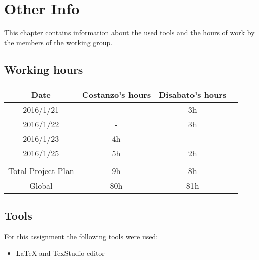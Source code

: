 \documentclass[\mainpath/main]{subfiles}
\begin{document}
\chapter{Other Info}
\label{OtherInfo}

\setmyfancystyle

This chapter contains information about the used tools and the hours of work by the members of the working group.

\section{Working hours}
\begin{table}[h!]
	\centering
\begin{tabular}{cccc}
\hline
Date     	& Costanzo's hours & Disabato's hours  & \\ \hline
2016/1/21 	& -			  	   & 3h 			   & \\ \hline
2016/1/22 	& -			  	   & 3h 			   & \\ \hline
2016/1/23   & 4h               & -                 & \\ \hline
2016/1/25   & 5h             & 2h                & \\ \hline
\\
Total Project Plan  & 9h 		 	   & 8h 			   & \\ \hline
Global 	    & 80h 		 	   & 81h 			   & \\ \hline

\end{tabular}
\end{table}

\section{Tools}
For this assignment the following tools were used:
\begin{itemize}
	\item \LaTeX{} and TexStudio editor
\end{itemize}
\end{document}
